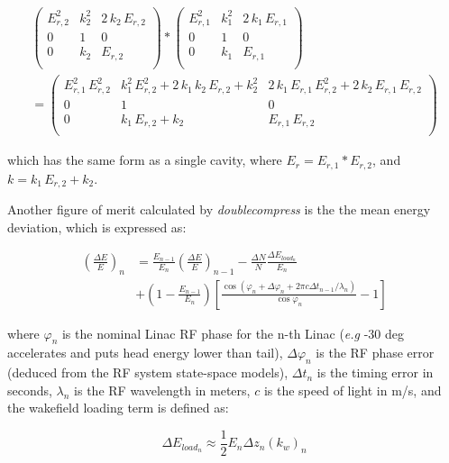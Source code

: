 \documentclass[a4paper,12pt]{article}
\begin{document}
\begin{multline}
\begin{pmatrix}E_{r,2}^2 & k_{2}^2 & 2\,k_{2}\,E_{r,2} \\ 0 & 1 & 0
  \\ 0 & k_{2} & E_{r,2} \\ \end{pmatrix}*\begin{pmatrix}E_{r,1}^2 & k_{1}^2 & 2\,k_{1}\,E_{r,1} \\ 0 & 1 & 0
  \\ 0 & k_{1} & E_{r,1} \\ \end{pmatrix}\\
  =
  \begin{pmatrix}E_{r,1}^2\,E_{r,2}^2 & k_{1}^2\,E_{r,2}^2+2\,k_{1}\,
 k_{2}\,E_{r,2}+k_{2}^2 & 2\,k_{1}\,E_{r,1}\,E_{r,2}^2+2\,k_{2}\,E_{r
 ,1}\,E_{r,2} \\ 0 & 1 & 0 \\ 0 & k_{1}\,E_{r,2}+k_{2} & E_{r,1}\,E_{
 r,2} \\ \end{pmatrix}
  \end{multline}

\noindent which has the same form as a single cavity, where $E_r=E_{r,1}*E_{r,2}$, and $k=k_{1}\,E_{r,2}+k_{2}$.

Another figure of merit calculated by \emph{doublecompress} is the the mean energy deviation, which is expressed as:

\begin{align}
  \left(\frac{\Delta E}{E}\right)_n &= \frac{E_{n-1}}{E_n} \left(\frac{\Delta E}{E}\right)_{n-1} -
    \frac{\Delta N}{N}\frac{\Delta E_{load_n}}{E_n}\nonumber \\
    &+ \left(1-\frac{E_{n-1}}{E_n}\right)\left[\frac{\cos(\varphi_n+\Delta \varphi_n+2\pi c \Delta t_{n-1}/\lambda_n)}{\cos \varphi_n} -1\right]
\end{align}

\noindent where $\varphi_n$ is the nominal Linac RF phase for the n-th Linac ({\it e.g} -30 deg accelerates and puts head energy lower than tail), $\Delta \varphi_n$ is the RF phase error (deduced from the RF system state-space models), $\Delta t_{n}$ is the timing error in seconds, $\lambda_n$ is the RF wavelength in meters, $c$ is the speed of light in m/s, and the wakefield loading term is defined as:

\begin{equation}
  \Delta E_{load_n} \approx \frac{1}{2}E_n \Delta z_n (k_w)_n
\end{equation}
\end{document}
